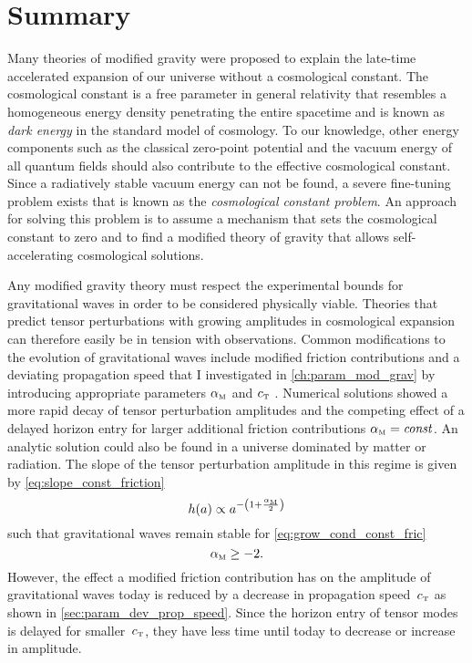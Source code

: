 \chapter{Summary}\label{ch:summary}

Many theories of modified gravity were proposed to explain the late-time accelerated expansion of our universe without a cosmological constant. The cosmological constant is a free parameter in general relativity that resembles a homogeneous energy density penetrating the entire spacetime and is known as \emph{dark energy} in the \LCDM{} standard model of cosmology. To our knowledge, other energy components such as the classical zero-point potential and the vacuum energy of all quantum fields should also contribute to the effective cosmological constant. Since a radiatively stable vacuum energy can not be found, a severe fine-tuning problem exists that is known as the \emph{cosmological constant problem}. An approach for solving this problem is to assume a mechanism that sets the cosmological constant to zero and to find a modified theory of gravity that allows self-accelerating cosmological solutions.

Any modified gravity theory must respect the experimental bounds for gravitational waves in order to be considered physically viable. Theories that predict tensor perturbations with growing amplitudes in cosmological expansion can therefore easily be in tension with observations. Common modifications to the evolution of gravitational waves include modified friction contributions and a deviating propagation speed that I investigated in \autoref{ch:param_mod_grav} by introducing appropriate parameters \({\alpha_{\textnormal{\tiny{M}}}}\) and \({c_{\textnormal{\tiny{T}}}}\) \autocite{Amendola2014,Pettorino2014}. Numerical solutions showed a more rapid decay of tensor perturbation amplitudes and the competing effect of a delayed horizon entry for larger additional friction contributions \({\alpha_{\textnormal{\tiny{M}}}}=\textnormal{\textit{const}}\). An analytic solution could also be found in a universe dominated by matter or radiation. The slope of the tensor perturbation amplitude in this regime is given by \eqref{eq:slope_const_friction}
\begin{equation}
	h(a) \propto a^{-\del{1+\frac{\alphaM}{2}}}
\end{equation}
such that gravitational waves remain stable for \eqref{eq:grow_cond_const_fric}
\begin{equation}
	{\alpha_{\textnormal{\tiny{M}}}} \geq -2
	\mathpunct{.}
\end{equation}
However, the effect a modified friction contribution has on the amplitude of gravitational waves today is reduced by a decrease in propagation speed~\({c_{\textnormal{\tiny{T}}}}\) as shown in \autoref{sec:param_dev_prop_speed}. Since the horizon entry of tensor modes is delayed for smaller~\({c_{\textnormal{\tiny{T}}}}\), they have less time until today to decrease or increase in amplitude.

